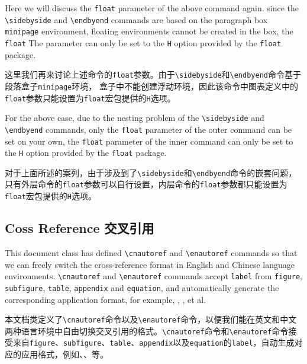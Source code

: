 

\begin{ParaColumn}

    Here we will discuss the \verb"float" parameter of the above command again.  since the \verb"\sidebyside" and \verb"\endbyend" commands are based on the paragraph box \verb"minipage" environment, floating environments cannot be created in the box, the \verb"float" The parameter can only be set to the \verb"H" option provided by the \verb"float" package.  

    \switchcolumn

    这里我们再来讨论上述命令的\verb"float"参数。由于\verb"\sidebyside"和\verb"\endbyend"命令基于段落盒子\verb"minipage"环境， 盒子中不能创建浮动环境，因此该命令中图表定义中的\verb"float"参数只能设置为\verb"float"宏包提供的\verb"H"选项。

    \switchcolumn*
    
    For the above case, due to the nesting problem of the \verb"\sidebyside" and \verb"\endbyend" commands, only the \verb"float" parameter of the outer command can be set on your own, the \verb"float" parameter of the inner command can only be set to the \verb"H" option provided by the \verb"float" package.

    \switchcolumn
    
    对于上面所述的案列，由于涉及到了\verb"\sidebyside"和\verb"\endbyend"命令的嵌套问题，只有外层命令的\verb"float"参数可以自行设置，内层命令的\verb"float"参数都只能设置为\verb"float"宏包提供的\verb"H"选项。

\end{ParaColumn}

\subsection{Coss Reference 交叉引用}

\begin{ParaColumn}

    This document class has defined \verb"\cnautoref" and \verb"\enautoref" commands so that we can freely switch the cross-reference format in English and Chinese language environments.  \verb"\cnautoref" and \verb"\enautoref" commands accept \verb"label" from \verb"figure", \verb"subfigure", \verb"table", \verb"appendix" and \verb"equation", and automatically generate the corresponding application format, for example, , ,  et al.

    \switchcolumn

    本文档类定义了\verb"\cnautoref"命令以及\verb"\enautoref"命令，以便我们能在英文和中文两种语言环境中自由切换交叉引用的格式。\verb"\cnautoref"命令和\verb"\enautoref"命令接受来自\verb"figure"、\verb"subfigure"、\verb"table"、\verb"appendix"以及\verb"equation"的\verb"label"，自动生成对应的应用格式，例如、、等。

\end{ParaColumn}


